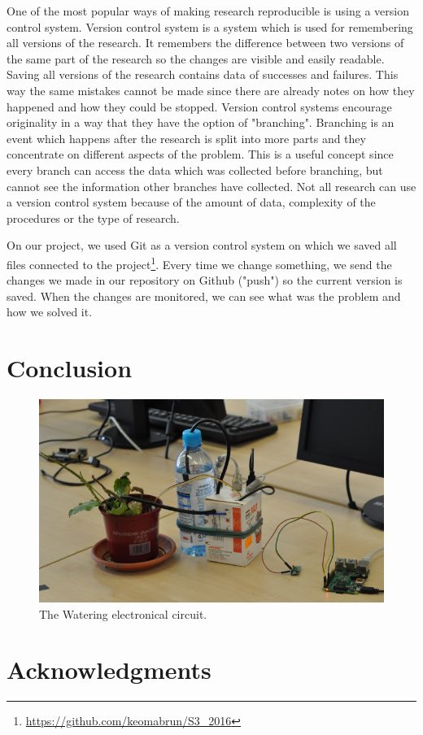 \documentclass[conference]{IEEEtran}
\begin{document}
One of the most popular ways of making research reproducible is using a version control system.
Version control system is a system which is used for remembering all versions of the research.
It remembers the difference between two versions of the same part of the research so the changes are visible and easily readable.
Saving all versions of the research contains data of successes and failures.
This way the same mistakes cannot be made since there are already notes on how they happened and how they could be stopped.
Version control systems encourage originality in a way that they have the option of "branching".
Branching is an event which happens after the research is split into more parts and they concentrate on different aspects of the problem.
This is a useful concept since every branch can access the data which was collected before branching, but cannot see the information other branches have collected.
Not all research can use a version control system because of the amount of data, complexity of the procedures or the type of research.


On our project, we used Git as a version control system on which we saved all files connected to the project\footnote{\url{https://github.com/keomabrun/S3\_2016}}.
Every time we change something, we send the changes we made in our repository on Github ("push") so the current version is saved.
When the changes are monitored, we can see what was the problem and how we solved it.


\section{Conclusion}
\label{sec:conclusion}

\begin{figure}
    \centering
    \includegraphics[width=\columnwidth]{final_box}
    \caption{The Watering electronical circuit.}
    \label{fig:final_box}
\end{figure}
\section*{Acknowledgments}





\begin{thebibliography}{10}
    \bibitem{}
    
\end{thebibliography}
\end{document}
